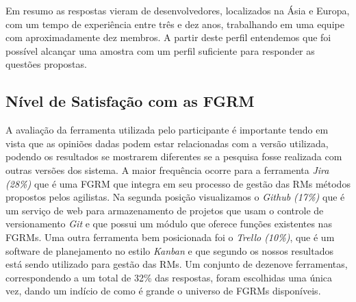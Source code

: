 
Em resumo as respostas vieram de desenvolvedores, localizados na Ásia e Europa,
com um tempo de experiência entre três e dez anos, trabalhando em uma equipe com
aproximadamente dez membros. A partir deste perfil entendemos que foi possível
alcançar uma amostra com um perfil suficiente para responder as questões
propostas.

\subsection{Nível de Satisfação com as FGRM}
\label{sub:nivel_de_satisfação_com_as_fgrm}

A avaliação da ferramenta utilizada pelo participante é importante tendo em
vista que as opiniões dadas podem estar relacionadas com a versão utilizada,
podendo os resultados se mostrarem diferentes se a pesquisa fosse realizada com
outras versões dos sistema. A maior frequência ocorre para a ferramenta
\textit{Jira (28\%)} que é uma FGRM que integra em seu processo de gestão das
RMs métodos propostos pelos agilistas. Na segunda posição visualizamos o
\textit{Github (17\%)} que é um serviço de web para armazenamento de projetos
que usam o controle de versionamento \textit{Git} e que possui um módulo que
oferece funções existentes nas FGRMs. Uma outra ferramenta bem posicionada foi o
\textit{Trello (10\%)}, que é um software de planejamento no estilo
\textit{Kanban} e que segundo os nossos resultados está sendo utilizado para
gestão das RMs. Um conjunto de dezenove ferramentas, correspondendo a um total
de 32\% das respostas, foram escolhidas uma única vez, dando um indício de como
é grande o universo de FGRMs disponíveis.


